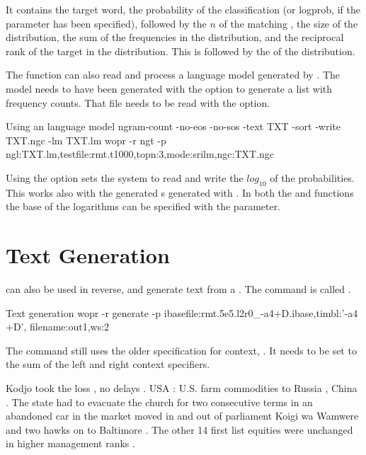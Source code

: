 \documentclass[a4paper,10pt,twoside]{report}
\begin{document}
It contains the target word, the probability of the classification (or
logprob, if the  parameter has been specified), followed by
the $n$ of the matching \ngram{}, the size of the distribution, the
sum of the frequencies in the distribution, and the reciprocal rank of
the target in the distribution. This is followed by the  of
the distribution.

The  function can also read and process a language model generated by
\srilm{}. The \srilm{} model needs to have been generated with the
 option to generate a list with \ngram{} frequency
counts. That file needs to be read with the  option. 

\begin{bash}{Using an \srilm{} language model}
ngram-count -no-eos -no-sos -text TXT -sort -write TXT.ngc -lm TXT.lm
wopr -r ngt -p ngl:TXT.lm,testfile:rmt.t1000,topn:3,mode:srilm,ngc:TXT.ngc
\end{bash}

Using the  option sets the system to read and write
the $log_{10}$ of the probabilities. This works also with the \wopr{}
generated \ngram{}s generated with . In both the 
and  functions the base of the logarithms can be specified
with the  parameter. 

\section{Text Generation}

\Wopr{} can also be used in reverse, and generate text from a
\lm{}. The command is called .

\begin{bash}{Text generation}
wopr -r generate -p ibasefile:rmt.5e5.l2r0_-a4+D.ibase,timbl:'-a4 +D',
                    filename:out1,ws:2
\end{bash}

The command still uses the older specification for context,
. It needs to be set to the sum of the left and right context
specifiers. 

\begin{wout}{}
Kodjo took the loss , no delays . 
USA : U.S. farm commodities to Russia , China . 
The state had to evacuate the church for two consecutive terms in an 
   abandoned car in the market moved in and out of parliament Koigi 
   wa Wamwere and two hawks on to Baltimore . 
The other 14 first list equities were unchanged in higher management
   ranks . 
\end{wout}
\end{document}
